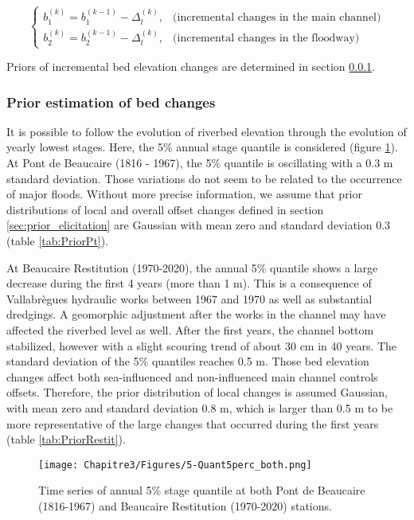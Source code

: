         \begin{equation}
          \begin{cases}
           b_1^{(k)} = b_1^{(k-1)}-\Delta_l^{(k)}, & \text{(incremental changes in the main channel)}\\
           b_2^{(k)} = b_2^{(k-1)}-\Delta_l^{(k)}, & \text{(incremental changes in the floodway)}
          \end{cases}
          \label{eq:SPD_Res}
        \end{equation}
        
        Priors of incremental bed elevation changes are determined in section \ref{sec:stageevolution}.

    \subsubsection{Prior estimation of bed changes}
    \label{sec:stageevolution}
    
    It is possible to follow the evolution of riverbed elevation through the evolution of yearly lowest stages. Here, the 5\% annual stage quantile is considered (figure \ref{fig:quantile5_both}). At Pont de Beaucaire (1816 - 1967), the 5\% quantile is oscillating with a 0.3 m standard deviation. Those variations do not seem to be related to the occurrence of major floods. Without more precise information, we assume that prior distributions of local and overall offset changes defined in section \ref{sec:prior_elicitation} are Gaussian with mean zero and standard deviation 0.3 (table \ref{tab:PriorPt}).
    
    At Beaucaire Restitution (1970-2020), the annual 5\% quantile shows a large decrease during the first 4 years (more than 1 m). This is a consequence of Vallabrègues hydraulic works between 1967 and 1970 as well as substantial dredgings. A geomorphic adjustment after the works in the channel may have affected the riverbed level as well. After the first years, the channel bottom stabilized, however with a slight scouring trend of about 30 cm in 40 years. The standard deviation of the 5\% quantiles reaches 0.5 m. Those bed elevation changes affect both sea-influenced and non-influenced main channel controls offsets. Therefore, the prior distribution of local changes is assumed Gaussian, with mean zero and standard deviation 0.8 m, which is larger than 0.5 m to be more representative of the large changes that occurred during the first years (table \ref{tab:PriorRestit}).
    
    \begin{figure}[h!]
        \centering
        \texttt{[image: Chapitre3/Figures/5-Quant5perc\_both.png]}
        \caption{Time series of annual 5\% stage quantile at both Pont de Beaucaire (1816-1967) and Beaucaire Restitution (1970-2020) stations.}
        \label{fig:quantile5_both}
    \end{figure}
            
